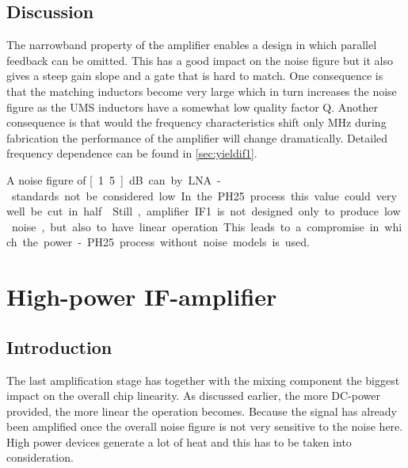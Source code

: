 		\subsection{Discussion}
			The narrowband property of the amplifier enables a design in which parallel feedback can be omitted. This has a good impact on the noise figure but it also gives a steep gain slope and a gate that is hard to match. One consequence is that the matching inductors become very large which in turn increases the noise figure as the UMS inductors have a somewhat low quality factor Q. Another consequence is that would the frequency characteristics shift only \unit[100]{MHz} during fabrication the performance of the amplifier will change dramatically. Detailed frequency dependence can be found in \autoref{sec:yieldif1}.
			
			A noise figure of \unit[1.5]{dB} can by LNA-standards not be considered low. In the PH25 process this value could very well be cut in half.\autocite{kyuko96} Still, amplifier IF1 is not designed only to produce  low  noise, but also to have linear operation. This leads to a compromise in which the power-PH25 process without noise models is used.


	\section{High-power IF-amplifier}
		\subsection{Introduction}\label{sec:if2power}
			The last amplification stage has together with the mixing component the biggest impact on the overall chip linearity. As discussed earlier, the more DC-power provided, the more linear the operation becomes. Because the signal has already been amplified once the overall noise figure is not very sensitive to the noise here. High power devices generate a lot of heat and this has to be taken into consideration.

